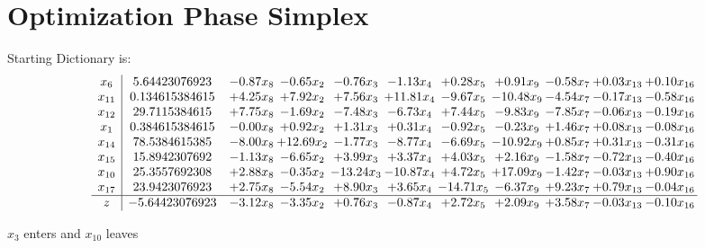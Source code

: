 \documentclass[9pt]{article}
\begin{document}
\section{Optimization Phase Simplex}
Starting Dictionary is:
\[\begin{array}{c| c c@{\hskip 2pt} c@{\hskip 2pt} c@{\hskip 2pt} c@{\hskip 2pt} c@{\hskip 2pt} c@{\hskip 2pt} c@{\hskip 2pt} c@{\hskip 2pt} c@{\hskip 2pt} }
 x_{6}   &  5.64423076923 & -0.87 x_{8} & -0.65 x_{2} & -0.76 x_{3} & -1.13 x_{4} & +  0.28 x_{5} & +  0.91 x_{9} & -0.58 x_{7} & +  0.03 x_{13} & +  0.10 x_{16}\\
 x_{11}   &  0.134615384615 & +  4.25 x_{8} & +  7.92 x_{2} & +  7.56 x_{3} & + 11.81 x_{4} & -9.67 x_{5} & -10.48 x_{9} & -4.54 x_{7} & -0.17 x_{13} & -0.58 x_{16}\\
 x_{12}   &  29.7115384615 & +  7.75 x_{8} & -1.69 x_{2} & -7.48 x_{3} & -6.73 x_{4} & +  7.44 x_{5} & -9.83 x_{9} & -7.85 x_{7} & -0.06 x_{13} & -0.19 x_{16}\\
 x_{1}   &  0.384615384615 & -0.00 x_{8} & +  0.92 x_{2} & +  1.31 x_{3} & +  0.31 x_{4} & -0.92 x_{5} & -0.23 x_{9} & +  1.46 x_{7} & +  0.08 x_{13} & -0.08 x_{16}\\
 x_{14}   &  78.5384615385 & -8.00 x_{8} & + 12.69 x_{2} & -1.77 x_{3} & -8.77 x_{4} & -6.69 x_{5} & -10.92 x_{9} & +  0.85 x_{7} & +  0.31 x_{13} & -0.31 x_{16}\\
 x_{15}   &  15.8942307692 & -1.13 x_{8} & -6.65 x_{2} & +  3.99 x_{3} & +  3.37 x_{4} & +  4.03 x_{5} & +  2.16 x_{9} & -1.58 x_{7} & -0.72 x_{13} & -0.40 x_{16}\\
 x_{10}   &  25.3557692308 & +  2.88 x_{8} & -0.35 x_{2} & -13.24 x_{3} & -10.87 x_{4} & +  4.72 x_{5} & + 17.09 x_{9} & -1.42 x_{7} & -0.03 x_{13} & +  0.90 x_{16}\\
 x_{17}   &  23.9423076923 & +  2.75 x_{8} & -5.54 x_{2} & +  8.90 x_{3} & +  3.65 x_{4} & -14.71 x_{5} & -6.37 x_{9} & +  9.23 x_{7} & +  0.79 x_{13} & -0.04 x_{16}\\
\hline
z    &  -5.64423076923 & -3.12 x_{8} & -3.35 x_{2} & +  0.76 x_{3} & -0.87 x_{4} & +  2.72 x_{5} & +  2.09 x_{9} & +  3.58 x_{7} & -0.03 x_{13} & -0.10 x_{16}\\
\end{array}\]


 $ x_{3} $ enters and $ x_{10} $ leaves 
\end{document}
